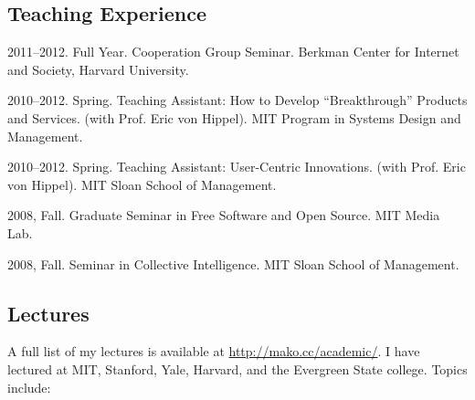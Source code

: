 \documentclass[10pt]{article}
\newenvironment{cvlist}{
\begin{list}{}{\leftmargin=3.0em \itemindent=-3.0em}
  \setlength{\itemsep}{0pt}
  \setlength{\parskip}{0em}
  \setlength{\parsep}{1em}
  \setlength{\parindent}{0em}}
{\vspace{1em}
\end{list}}
\begin{document}
\subsection{Teaching Experience}
\begin{cvlist}
\item 2011--2012. Full Year. Cooperation Group Seminar. Berkman Center
  for Internet and Society, Harvard University.
\item 2010--2012. Spring. Teaching Assistant: How to Develop ``Breakthrough''
  Products and Services. (with Prof. Eric von Hippel). MIT Program in
  Systems Design and Management.
\item 2010--2012. Spring. Teaching Assistant: User-Centric
  Innovations. (with Prof. Eric von Hippel). MIT Sloan School of
  Management.
\item 2008, Fall. Graduate Seminar in Free Software and Open
  Source. MIT Media Lab.
\item 2008, Fall. Seminar in Collective Intelligence. MIT Sloan School
  of Management.
\end{cvlist}

\subsection{Lectures}

A full list of my lectures is available at
\url{http://mako.cc/academic/}. I have lectured at MIT, Stanford,
Yale, Harvard, and the Evergreen State college. Topics include:
\end{document}
